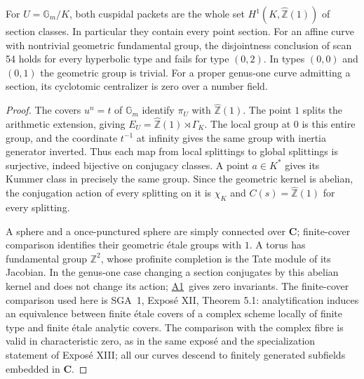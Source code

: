 \documentclass[11pt,a4paper]{article}
\newcommand{\Z}{\mathbb Z}
\newcommand{\Gm}{\mathbb G_m}
\newcommand{\Zhat}{\widehat{\mathbb Z}}
\newcommand{\resref}[1]{\hyperref[res:#1]{#1}}
\newcommand{\Arith}{\resref{A1}}
\begin{document}
For $U=\Gm/K$, both cuspidal packets are the whole set
$H^1(K,\Zhat(1))$ of section classes. In particular they contain every point section. For an affine curve with nontrivial geometric fundamental group, the disjointness conclusion of scan 54 holds for every hyperbolic type and fails for type $(0,2)$. In types $(0,0)$ and $(0,1)$ the geometric group is trivial. For a proper genus-one curve admitting a section, its cyclotomic centralizer is zero over a number field.
\begin{proof}
The covers $u^n=t$ of $\Gm$ identify $\pi_U$ with $\Zhat(1)$. The point $1$ splits the arithmetic extension, giving $E_U=\Zhat(1)\rtimes\Gamma_K$. The local group at $0$ is this entire group, and the coordinate $t^{-1}$ at infinity gives the same group with inertia generator inverted. Thus each map from local splittings to global splittings is surjective, indeed bijective on conjugacy classes. A point $a\in K^*$ gives its Kummer class in precisely the same group. Since the geometric kernel is abelian, the conjugation action of every splitting on it is $\chi_K$ and $C(s)=\Zhat(1)$ for every splitting.

A sphere and a once-punctured sphere are simply connected over $\mathbf C$; finite-cover comparison identifies their geometric étale groups with $1$. A torus has fundamental group $\Z^2$, whose profinite completion is the Tate module of its Jacobian. In the genus-one case changing a section conjugates by this abelian kernel and does not change its action; \Arith\ gives zero invariants. The finite-cover comparison used here is SGA~1, Exposé XII, Theorem 5.1: analytification induces an equivalence between finite étale covers of a complex scheme locally of finite type and finite étale analytic covers. The comparison with the complex fibre is valid in characteristic zero, as in the same exposé and the specialization statement of Exposé XIII; all our curves descend to finitely generated subfields embedded in $\mathbf C$.
\end{proof}
\end{document}
